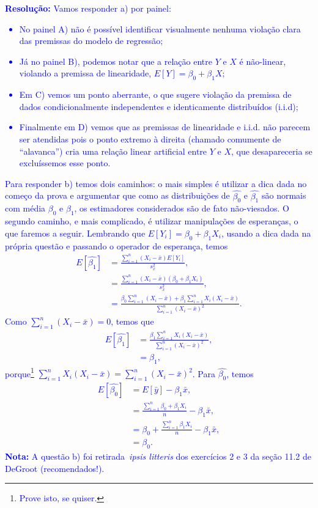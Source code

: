 \documentclass[a4paper,10pt, notitlepage]{report}
\begin{document}
\textcolor{blue}{
\textbf{Resolução:}
Vamos responder a) por painel:
\begin{itemize}
 \item No painel A) não é possível identificar visualmente nenhuma violação clara das premissas do modelo de regressão;
 \item Já no painel B), podemos notar que a relação entre $Y$ e $X$ é não-linear, violando a premissa de linearidade, $E[Y] = \beta_0 + \beta_1X$;
 \item Em C) vemos um ponto aberrante, o que sugere violação da premissa de dados condicionalmente independentes e identicamente distribuídos (i.i.d);
 \item Finalmente em D) vemos que as premissas de linearidade e i.i.d. não parecem ser atendidas pois o ponto extremo à direita (chamado comumente de ``alavanca'') cria uma relação linear artificial entre $Y$ e $X$, que desapareceria se excluíssemos esse ponto.
\end{itemize}
Para responder b) temos dois caminhos: o mais simples é utilizar a dica dada no começo da prova e argumentar que como as distribuições de $\hat{\beta_0}$ e $\hat{\beta_1}$ são normais com média $\beta_0$ e $\beta_1$, os estimadores considerados são de fato não-viesados.
O segundo caminho, e mais complicado, é utilizar manipulações de esperanças, o que faremos a seguir.
Lembrando que $E[Y_i] = \beta_0 + \beta_1 X_i$, usando a dica dada na própria questão e passando o operador de esperança, temos
\begin{align*}
 E[\hat{\beta_1}] &= \frac{\sum_{i=1}^n \left(X_i-\bar{x}\right)E[Y_i]}{s_x^2},\\&= \frac{\sum_{i=1}^n \left(X_i-\bar{x}\right)\left(\beta_0 + \beta_1 X_i\right)}{s_x^2},\\
 &= \frac{\beta_0\sum_{i=1}^n\left(X_i-\bar{x}\right) + \beta_1\sum_{i=1}^nX_i\left(X_i-\bar{x}\right)}{\sum_{i=1}^n \left(X_i-\bar{x}\right)^2}.
\end{align*}
Como $\sum_{i=1}^n\left(X_i-\bar{x}\right) = 0$, temos que 
\begin{align*}
  E[\hat{\beta_1}] &= \frac{\beta_1\sum_{i=1}^nX_i\left(X_i-\bar{x}\right)}{\sum_{i=1}^n \left(X_i-\bar{x}\right)^2},\\
  &= \beta_1,
\end{align*}
porque\footnote{\textcolor{blue}{Prove isto, se quiser.}} $\sum_{i=1}^nX_i\left(X_i-\bar{x}\right) = \sum_{i=1}^n \left(X_i-\bar{x}\right)^2$.
Para $\hat{\beta_0}$, temos 
\begin{align*}
  E[\hat{\beta_0}] &= E[\bar{y}] - \beta_1\bar{x},\\
  &= \frac{\sum_{i=1}^n \beta_0 + \beta_1X_i}{n} - \beta_1\bar{x},\\
  &= \beta_0  + \frac{\sum_{i=1}^n \beta_1X_i}{n} - \beta_1\bar{x},\\
  &= \beta_0.
\end{align*}
\textbf{Nota:} A questão b) foi retirada~\textit{ipsis litteris} dos exercícios  2 e 3 da seção 11.2 de DeGroot (recomendados!). 
}
\end{document}
